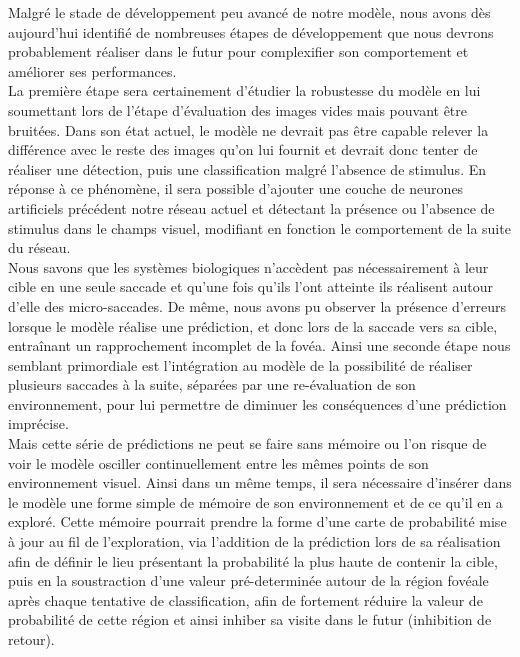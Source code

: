 Malgré le stade de développement peu avancé de notre modèle, nous avons dès aujourd'hui identifié de nombreuses étapes de développement que nous devrons probablement réaliser dans le futur pour complexifier son comportement et améliorer ses performances. \\
La première étape sera certainement d'étudier la robustesse du modèle en lui soumettant lors de l'étape d'évaluation des images vides mais pouvant être bruitées.
Dans son état actuel, le modèle ne devrait pas être capable relever la différence avec le reste des images qu'on lui fournit et devrait donc tenter de réaliser une détection, puis une classification malgré l'absence de stimulus.
En réponse à ce phénomène, il sera possible d'ajouter une couche de neurones artificiels précédent notre réseau actuel et détectant la présence ou l'absence de stimulus dans le champs visuel, modifiant en fonction le comportement de la suite du réseau. \\
Nous savons que les systèmes biologiques n'accèdent pas nécessairement à leur cible en une seule saccade et qu'une fois qu'ils l'ont atteinte ils réalisent autour d'elle des micro-saccades.
De même, nous avons pu observer la présence d'erreurs lorsque le modèle réalise une prédiction, et donc lors de la saccade vers sa cible, entraînant un rapprochement incomplet de la fovéa.
Ainsi une seconde étape nous semblant primordiale est l'intégration au modèle de la possibilité de réaliser plusieurs saccades à la suite, séparées par une re-évaluation de son environnement, pour lui permettre de diminuer les conséquences d'une prédiction imprécise. \autocite{Najemnik2005, Werner2014}\\
Mais cette série de prédictions ne peut se faire sans mémoire ou l'on risque de voir le modèle osciller continuellement entre les mêmes points de son environnement visuel.
Ainsi dans un même temps, il sera nécessaire d'insérer dans le modèle une forme simple de mémoire de son environnement et de ce qu'il en a exploré.
Cette mémoire pourrait prendre la forme d'une carte de probabilité mise à jour au fil de l'exploration, via l'addition de la prédiction lors de sa réalisation afin de définir le lieu présentant la probabilité la plus haute de contenir la cible, puis en la soustraction d'une valeur pré-determinée autour de la région fovéale après chaque tentative de classification, afin de fortement réduire la valeur de probabilité de cette région et ainsi inhiber sa visite dans le futur (inhibition de retour). \autocite{Najemnik2005, Werner2014, Zhaoping2014} \\